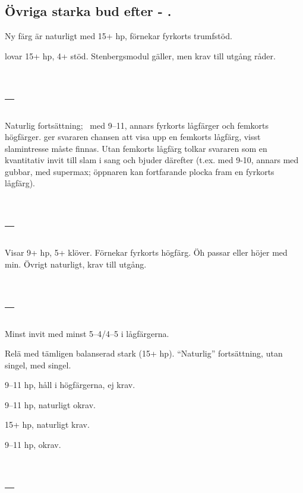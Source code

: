 \subsection{Övriga starka bud efter  - .}

Ny f\"arg \"ar natur\-ligt med 15+ hp, f\"or\-nekar fyrkorts trumf\-st{\"o}d.

 lovar 15+ hp, 4+ stöd. Stenbergsmodul gäller, men krav till utgång
råder. 

\section{ -- }

Naturlig forts\"attning; \pass\ med 9--11,
annars fyrkorts l{\aa}gf\"arger och femkorts h\"ogf\"arger.
 ger svararen chansen att
visa upp en femkorts l{\aa}gf\"arg, visst slamintresse m{\aa}ste finnas.
Utan femkorts l{\aa}gf\"arg tolkar svararen  som en kvantitativ invit
till slam i sang och bjuder d\"arefter (t.ex.  med 9-10, annars
 med gubbar,  med supermax; \"oppnaren kan fortfarande
plocka fram en fyrkorts l{\aa}gf\"arg).

\section{ -- }

Visar 9+ hp, 5+ klöver. Förnekar fyrkorts högfärg. Öh passar eller höjer
med min. Övrigt naturligt, krav till utgång.

\section{ -- }

Minst invit med minst 5--4/4--5 i lågfärgerna.
\bbe
\item[\spa{2}] Relä med tämligen balanserad stark
  (15+ hp). ``Naturlig'' fortsättning, 
   utan singel,   med singel.
\item[\NT{2}] 9--11 hp, håll i högfärgerna, ej krav.
\item[\la{3}] 9--11 hp, naturligt okrav.
\item[\ho{3}] 15+ hp, naturligt krav.
\item[\NT{3}] 9--11 hp, okrav.
\ebe

\section{ -- }
  
